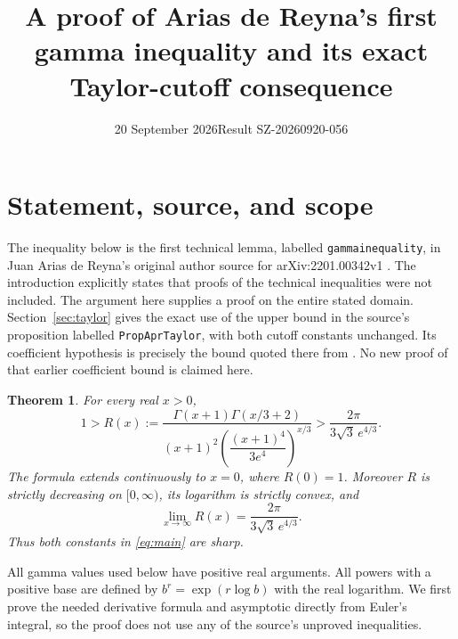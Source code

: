 \documentclass[11pt]{article}
\title{A proof of Arias de Reyna's first gamma inequality\newline
and its exact Taylor-cutoff consequence}
\author{}
\date{20 September 2026\quad Result SZ-20260920-056}
\newtheorem{theorem}{Theorem}
\begin{document}
\maketitle

\section{Statement, source, and scope}\label{sec:scope}
The inequality below is the first technical lemma, labelled
\texttt{gammainequality}, in Juan Arias de Reyna's original author source
for arXiv:2201.00342v1 \cite[Section 3.10]{AriasII}. The introduction
explicitly states that proofs of the technical inequalities were not
included. The argument here supplies a proof on the entire stated
domain. Section~\ref{sec:taylor} gives the exact use of the upper bound
in the source's proposition labelled \texttt{PropAprTaylor}, with both
cutoff constants unchanged. Its coefficient hypothesis is precisely
the bound quoted there from \cite[formulas (47) and (56)]{AriasI}.
No new proof of that earlier coefficient bound is claimed here.

\begin{theorem}\label{thm:gamma}
For every real $x>0$,
\begin{equation}\label{eq:main}
1>
R(x):=\frac{\Gamma(x+1)\Gamma(x/3+2)}
{(x+1)^2\left(\dfrac{(x+1)^4}{3e^4}\right)^{x/3}}
>\frac{2\pi}{3\sqrt3\,e^{4/3}}.
\end{equation}
The formula extends continuously to $x=0$, where $R(0)=1$.
Moreover $R$ is strictly decreasing on $[0,\infty)$, its logarithm
is strictly convex, and
\begin{equation}\label{eq:Rlimit}
\lim_{x\to\infty}R(x)=\frac{2\pi}{3\sqrt3\,e^{4/3}}.
\end{equation}
Thus both constants in \eqref{eq:main} are sharp.
\end{theorem}

All gamma values used below have positive real arguments. All powers
with a positive base are defined by $b^r=\exp(r\log b)$ with the real
logarithm. We first prove the needed derivative formula and asymptotic
directly from Euler's integral, so the proof does not use any of the
source's unproved inequalities.
\end{document}
